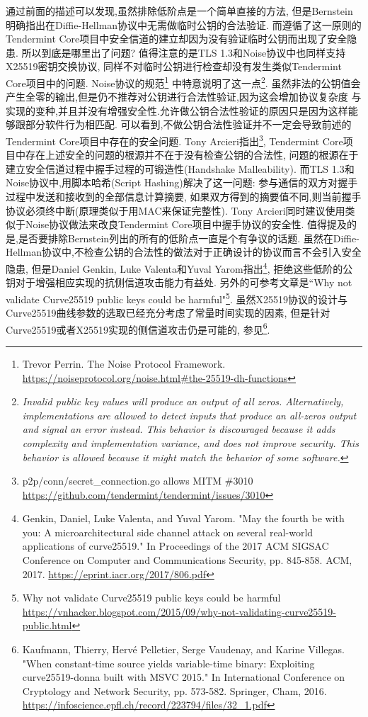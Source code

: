 通过前面的描述可以发现,虽然排除低阶点是一个简单直接的方法,
但是Bernstein明确指出在Diffie-Hellman协议中无需做临时公钥的合法验证.
而遵循了这一原则的Tendermint Core项目中安全信道的建立却因为没有验证临时公钥而出现了安全隐患.
所以到底是哪里出了问题? 值得注意的是TLS 1.3和Noise协议中也同样支持X25519密钥交换协议,
同样不对临时公钥进行检查却没有发生类似Tendermint Core项目中的问题.
Noise协议的规范\footnote{
Trevor Perrin. The Noise Protocol Framework.
\url{https://noiseprotocol.org/noise.html\#the-25519-dh-functions}}
中特意说明了这一点\footnote{\textit{Invalid public key values will produce an output of all zeros.
Alternatively, implementations are allowed to detect inputs that produce an all-zeros output and signal an error instead. This behavior is discouraged because it adds complexity and implementation variance, and does not improve security. This behavior is allowed because it might match the behavior of some software.}}.
虽然非法的公钥值会产生全零的输出,但是仍不推荐对公钥进行合法性验证,因为这会增加协议复杂度
与实现的变种,并且并没有增强安全性.允许做公钥合法性验证的原因只是因为这样能够跟部分软件行为相匹配.
可以看到,不做公钥合法性验证并不一定会导致前述的Tendermint Core项目中存在的安全问题.
Tony Arcieri指出\footnote{
p2p/conn/secret_connection.go allows MITM \#3010
\url{https://github.com/tendermint/tendermint/issues/3010}}, 
Tendermint Core项目中存在上述安全的问题的根源并不在于没有检查公钥的合法性,
问题的根源在于建立安全信道过程中握手过程的可锻造性(Handshake Malleability).
而TLS 1.3和Noise协议中,用脚本哈希(Script Hashing)解决了这一问题:
参与通信的双方对握手过程中发送和接收到的全部信息计算摘要,
如果双方得到的摘要值不同,则当前握手协议必须终中断(原理类似于用MAC来保证完整性).
Tony Arcieri同时建议使用类似于Noise协议做法来改良Tendermint Core项目中握手协议的安全性.
值得提及的是,是否要排除Bernstein列出的所有的低阶点一直是个有争议的话题.
虽然在Diffie-Hellman协议中,不检查公钥的合法性的做法对于正确设计的协议而言不会引入安全隐患,
但是Daniel Genkin, Luke Valenta和Yuval Yarom指出\footnote{
Genkin, Daniel, Luke Valenta, and Yuval Yarom. "May the fourth be with you: A microarchitectural side channel attack on several real-world applications of curve25519." In Proceedings of the 2017 ACM SIGSAC Conference on Computer and Communications Security, pp. 845-858. ACM, 2017.
\url{https://eprint.iacr.org/2017/806.pdf}}, 
拒绝这些低阶的公钥对于增强相应实现的抗侧信道攻击能力有益处.
另外的可参考文章是``Why not validate Curve25519 public keys could be harmful"\footnote{
Why not validate Curve25519 public keys could be harmful 
\url{https://vnhacker.blogspot.com/2015/09/why-not-validating-curve25519-public.html}
}.
虽然X25519协议的设计与Curve25519曲线参数的选取已经充分考虑了常量时间实现的因素,
但是针对Curve25519或者X25519实现的侧信道攻击仍是可能的, 参见\footnote{
Kaufmann, Thierry, Hervé Pelletier, Serge Vaudenay, and Karine Villegas. "When constant-time source yields variable-time binary: Exploiting curve25519-donna built with MSVC 2015." In International Conference on Cryptology and Network Security, pp. 573-582. Springer, Cham, 2016.
\url{https://infoscience.epfl.ch/record/223794/files/32_1.pdf}}.